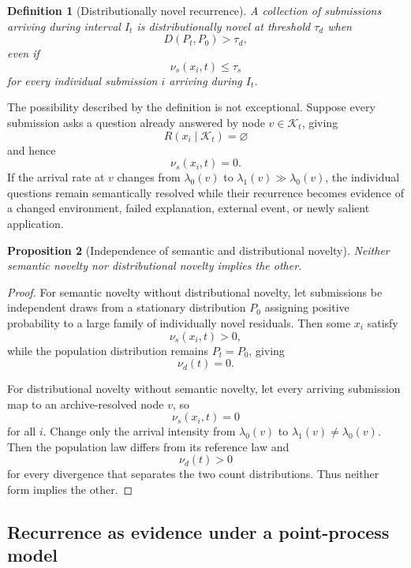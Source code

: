 \documentclass[11pt]{article}
\newtheorem{definition}{Definition}[section]
\newtheorem{proposition}[definition]{Proposition}
\theoremstyle{definition}
\newcommand{\K}{\mathcal{K}}
\begin{document}
\begin{definition}[Distributionally novel recurrence]
A collection of submissions arriving during interval \(I_t\) is distributionally novel at threshold \(\tau_d\) when
\[
D(P_t,P_0)>\tau_d,
\]
even if
\[
\nu_s(x_i,t)\leq\tau_s
\]
for every individual submission \(i\) arriving during \(I_t\).
\end{definition}

The possibility described by the definition is not exceptional. Suppose every submission asks a question already answered by node \(v\in\K_t\), giving
\[
R(x_i\mid\K_t)=\varnothing
\]
and hence
\[
\nu_s(x_i,t)=0.
\]
If the arrival rate at \(v\) changes from \(\lambda_0(v)\) to \(\lambda_1(v)\gg\lambda_0(v)\), the individual questions remain semantically resolved while their recurrence becomes evidence of a changed environment, failed explanation, external event, or newly salient application.

\begin{proposition}[Independence of semantic and distributional novelty]
Neither semantic novelty nor distributional novelty implies the other.
\end{proposition}

\begin{proof}
For semantic novelty without distributional novelty, let submissions be independent draws from a stationary distribution \(P_0\) assigning positive probability to a large family of individually novel residuals. Then some \(x_i\) satisfy
\[
\nu_s(x_i,t)>0,
\]
while the population distribution remains \(P_t=P_0\), giving
\[
\nu_d(t)=0.
\]

For distributional novelty without semantic novelty, let every arriving submission map to an archive-resolved node \(v\), so
\[
\nu_s(x_i,t)=0
\]
for all \(i\). Change only the arrival intensity from \(\lambda_0(v)\) to \(\lambda_1(v)\neq\lambda_0(v)\). Then the population law differs from its reference law and
\[
\nu_d(t)>0
\]
for every divergence that separates the two count distributions. Thus neither form implies the other.
\end{proof}

\subsection{Recurrence as evidence under a point-process model}
\end{document}
